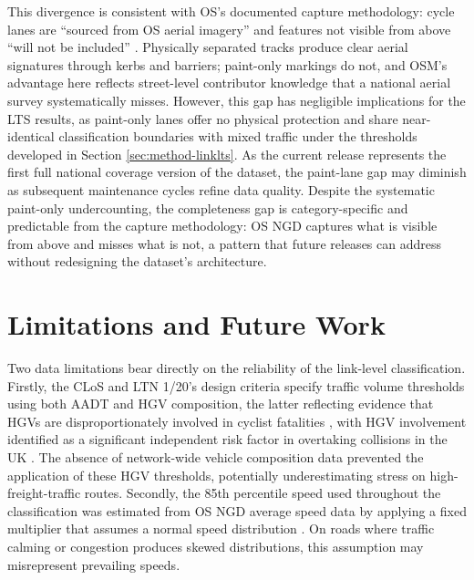 This divergence is consistent with OS's documented capture methodology: cycle lanes are ``sourced from OS aerial imagery'' and features not visible from above ``will not be included'' \parencite{ordnancesurvey2025}. Physically separated tracks produce clear aerial signatures through kerbs and barriers; paint-only markings do not, and OSM's advantage here reflects street-level contributor knowledge that a national aerial survey systematically misses. However, this gap has negligible implications for the LTS results, as paint-only lanes offer no physical protection and share near-identical classification boundaries with mixed traffic under the thresholds developed in Section \ref{sec:method-linklts}. As the current release represents the first full national coverage version of the dataset, the paint-lane gap may diminish as subsequent maintenance cycles refine data quality. Despite the systematic paint-only undercounting, the completeness gap is category-specific and predictable from the capture methodology: OS NGD captures what is visible from above and misses what is not, a pattern that future releases can address without redesigning the dataset's architecture.

\section{Limitations and Future Work}
\label{sec:disc-limitations}

Two data limitations bear directly on the reliability of the link-level classification. Firstly, the CLoS and LTN 1/20's design criteria specify traffic volume thresholds using both AADT and HGV composition, the latter reflecting evidence that HGVs are disproportionately involved in cyclist fatalities \parencite{morgan2010}, with HGV involvement identified as a significant independent risk factor in overtaking collisions in the UK \parencite{chao2025}. The absence of network-wide vehicle composition data prevented the application of these HGV thresholds, potentially underestimating stress on high-freight-traffic routes. Secondly, the 85th percentile speed used throughout the classification was estimated from OS NGD average speed data by applying a fixed multiplier that assumes a normal speed distribution \parencite{nationalhighways2019}. On roads where traffic calming or congestion produces skewed distributions, this assumption may misrepresent prevailing speeds.

